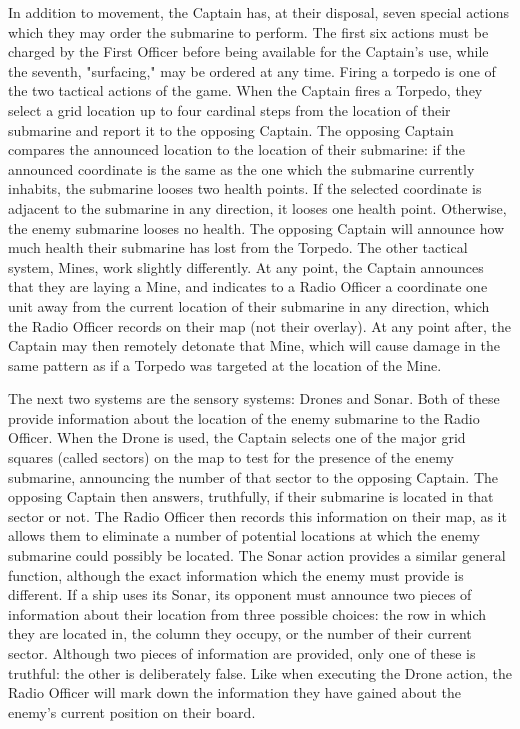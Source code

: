
In addition to movement, the Captain has, at their disposal, seven special actions which they may order the submarine to perform. The first six actions must be charged by the First Officer before being available for the Captain's use, while the seventh, "surfacing," may be ordered at any time. Firing a torpedo is one of the two tactical actions of the game. When the Captain fires a Torpedo, they select a grid location up to four cardinal steps from the location of their submarine and report it to the opposing Captain. The opposing Captain compares the announced location to the location of their submarine: if the announced coordinate is the same as the one which the submarine currently inhabits, the submarine looses two health points. If the selected coordinate is adjacent to the submarine in any direction, it looses one health point. Otherwise, the enemy submarine looses no health. The opposing Captain will announce how much health their submarine has lost from the Torpedo. The other tactical system, Mines, work slightly differently. At any point, the Captain announces that they are laying a Mine, and indicates to a Radio Officer a coordinate one unit away from the current location of their submarine in any direction, which the Radio Officer records on their map (not their overlay). At any point after, the Captain may then remotely detonate that Mine, which will cause damage in the same pattern as if a Torpedo was targeted at the location of the Mine. 

The next two systems are the sensory systems: Drones and Sonar. Both of these provide information about the location of the enemy submarine to the Radio Officer. When the Drone is used, the Captain selects one of the major grid squares (called sectors) on the map to test for the presence of the enemy submarine, announcing the number of that sector to the opposing Captain. The opposing Captain then answers, truthfully, if their submarine is located in that sector or not. The Radio Officer then records this information on their map, as it allows them to eliminate a number of potential locations at which the enemy submarine could possibly be located. The Sonar action provides a similar general function, although the exact information which the enemy must provide is different. If a ship uses its Sonar, its opponent must announce two pieces of information about their location from three possible choices: the row in which they are located in, the column they occupy, or the number of their current sector. Although two pieces of information are provided, only one of these is truthful: the other is deliberately false. Like when executing the Drone action, the Radio Officer will mark down the information they have gained about the enemy's current position on their board.

